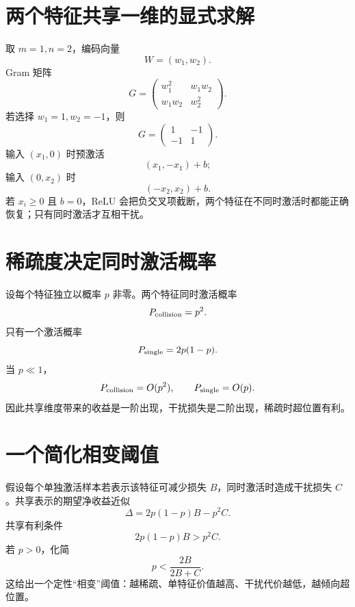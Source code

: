 \documentclass[UTF8,12pt,a4paper,fontset=none]{ctexart}
\numberwithin{equation}{section}
\begin{document}
\section{两个特征共享一维的显式求解}
取 $m=1,n=2$，编码向量
\begin{equation}
 W=(w_1,w_2).
\end{equation}
Gram 矩阵
\begin{equation}
 G=\begin{pmatrix}w_1^2&w_1w_2\\w_1w_2&w_2^2\end{pmatrix}.
\end{equation}
若选择 $w_1=1,w_2=-1$，则
\begin{equation}
 G=\begin{pmatrix}1&-1\\-1&1\end{pmatrix}.
\end{equation}
输入 $(x_1,0)$ 时预激活
\begin{equation}
 (x_1,-x_1)+b;
\end{equation}
输入 $(0,x_2)$ 时
\begin{equation}
 (-x_2,x_2)+b.
\end{equation}
若 $x_i\ge0$ 且 $b=0$，ReLU 会把负交叉项截断，两个特征在不同时激活时都能正确恢复；只有同时激活才互相干扰。

\section{稀疏度决定同时激活概率}
设每个特征独立以概率 $p$ 非零。两个特征同时激活概率
\begin{equation}
 P_{\rm collision}=p^2.
\end{equation}
只有一个激活概率
\begin{equation}
 P_{\rm single}=2p(1-p).
\end{equation}
当 $p\ll1$，
\begin{equation}
 P_{\rm collision}=O(p^2),
 \qquad P_{\rm single}=O(p).
\end{equation}
因此共享维度带来的收益是一阶出现，干扰损失是二阶出现，稀疏时超位置有利。

\section{一个简化相变阈值}
假设每个单独激活样本若表示该特征可减少损失 $B$，同时激活时造成干扰损失 $C$。共享表示的期望净收益近似
\begin{equation}
 \Delta=2p(1-p)B-p^2C.
\end{equation}
共享有利条件
\begin{equation}
 2p(1-p)B>p^2C.
\end{equation}
若 $p>0$，化简
\begin{equation}
 p<\frac{2B}{2B+C}.
\end{equation}
这给出一个定性“相变”阈值：越稀疏、单特征价值越高、干扰代价越低，越倾向超位置。
\end{document}
